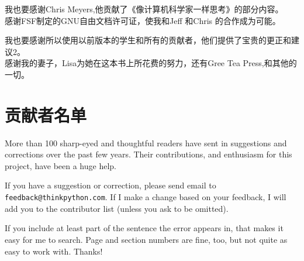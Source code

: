 我也要感谢Chris Meyers,他贡献了《像计算机科学家一样思考》的部分内容。\\

感谢FSF制定的GNU自由文档许可证，使我和Jeff 和Chris 的合作成为可能。\\


我也要感谢所以使用以前版本的学生和所有的贡献者，他们提供了宝贵的更正和建议2。\\

感谢我的妻子，Lisa为她在这本书上所花费的努力，还有Gree Tea Press,和其他的一切。

\section*{贡献者名单}


More than 100 sharp-eyed and thoughtful readers have sent in
suggestions and corrections over the past few years.  Their
contributions, and enthusiasm for this project, have been a
huge help.

If you have a suggestion or correction, please send email to 
{\tt feedback@thinkpython.com}.  If I make a change based on your
feedback, I will add you to the contributor list
(unless you ask to be omitted).

If you include at least part of the sentence the
error appears in, that makes it easy for me to search.  Page and
section numbers are fine, too, but not quite as easy to work with.
Thanks!

\small

